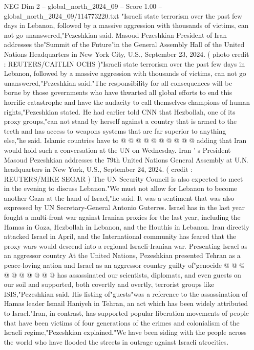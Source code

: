 \begin{textsample}{NEG Dim 2 – global\_north\_2024\_09 – Score 1.00 – global\_north\_2024\_09/114773220.txt}  \label{ex:f2_neg_035}
"Israeli state terrorism over the past few days in Lebanon, followed by a massive aggression with thousands of victims, can not go unanswered,"Pezeshkian said.
Masoud Pezeshkian President of Iran addresses the"Summit of the Future"in the General Assembly Hall of the United Nations Headquarters in New York City, U.S., September 23, 2024. ( photo credit : REUTERS/CAITLIN OCHS )"Israeli state terrorism over the past few days in Lebanon, followed by a massive aggression with thousands of victims, can not go unanswered,"Pezeshkian said."The responsibility for all consequences will be borne by those governments who have thwarted all global efforts to end this horrific catastrophe and have the audacity to call themselves champions of human rights,"Pezeshkian stated.
He had earlier told CNN that Hezbollah, one of its proxy groups,"can not stand by herself against a country that is armed to the teeth and has access to weapons systems that are far superior to anything else,"he said.
Islamic countries have to @ @ @ @ @ @ @ @ @ @ adding that Iran would hold such a conversation at the UN on Wednesday.
Iran ' s President Masoud Pezeshkian addresses the 79th United Nations General Assembly at U.N. headquarters in New York, U.S., September 24, 2024. ( credit : REUTERS/MIKE SEGAR ) The UN Security Council is also expected to meet in the evening to discuss Lebanon."We must not allow for Lebanon to become another Gaza at the hand of Israel,"he said.
It was a sentiment that was also expressed by UN Secretary-General Antonio Guterres.
Israel has in the last year fought a multi-front war against Iranian proxies for the last year, including the Hamas in Gaza, Hezbollah in Lebanon, and the Houthis in Lebanon.
Iran directly attacked Israel in April, and the International community has feared that the proxy wars would descend into a regional Israeli-Iranian war.
Presenting Israel as an aggressor country At the United Nations, Pezeshkian presented Tehran as a peace-loving nation and Israel as an aggressor country guilty of"genocide @ @ @ @ @ @ @ @ @ @ has assassinated our scientists, diplomats, and even guests on our soil and supported, both covertly and overtly, terrorist groups like ISIS,"Pezeshkian said.
His listing of"guests"was a reference to the assassination of Hamas leader Ismail Haniyeh in Tehran, an act which has been widely attributed to Israel."Iran, in contrast, has supported popular liberation movements of people that have been victims of four generations of the crimes and colonialism of the Israeli regime,"Pezeshkian explained."We have been siding with the people across the world who have flooded the streets in outrage against Israeli atrocities.

\end{textsample}
